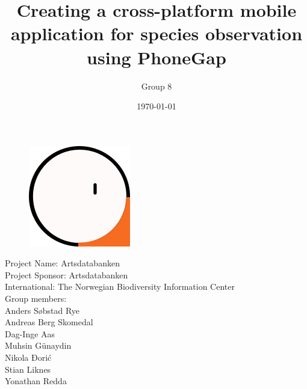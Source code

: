 \documentclass[a4paper]{article}
\begin{document}
  \title{Creating a cross-platform mobile application for species observation using PhoneGap}
  
  \begin{figure}
    \centering
        \includegraphics[scale=1.0]{Logo_.png}
  \end{figure}
    
	\author{Group 8}
	\date{\today}
	\maketitle
	\thispagestyle{empty}
	\pagebreak

	\pagestyle{empty}
	\begin{center}
		Project Name: Artsdatabanken \\
		Project Sponsor: Artsdatabanken \\
		International: The Norwegian Biodiversity Information Center \\
    Group members: \\
    Anders Søbstad Rye\\
    Andreas Berg Skomedal\\
    Dag-Inge Aas\\
    Muhsin Günaydin\\
    Nikola Đorić\\
    Stian Liknes\\
    Yonathan Redda
	\end{center}
	\newpage

	\tableofcontents
	\listoffigures
	\listoftables

	\newpage
	\pagestyle{plain}
	\setcounter{page}{1}
  

  \newpage
	

  \newpage
  

	\newpage
	

	\newpage
	

	\newpage

	

	\newpage
	

	\newpage
	

	\newpage
	

	\newpage
	
	
	\newpage
	

	\newpage	
	
	\newpage
	
	
	
	\newpage
	\clearpage
		\nocite{*}
		
		
\end{document}
